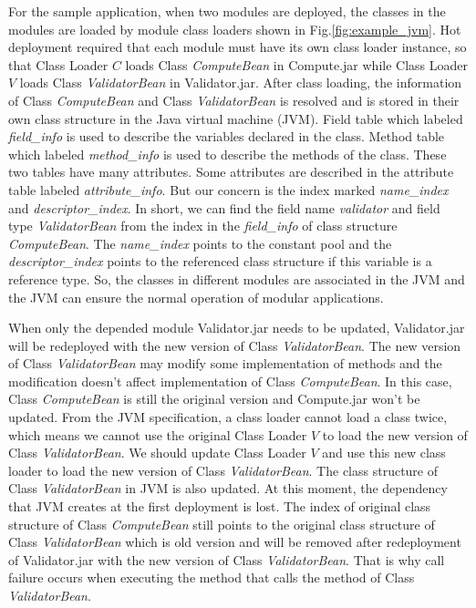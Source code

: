 \documentclass[conference]{IEEEtran}
\begin{document}
For the sample application, when two modules are deployed, the classes in the modules are loaded by module class loaders shown in Fig.\ref{fig:example_jvm}. 
Hot deployment required that each module must have its own class loader instance, so that Class Loader $C$ loads Class \emph{ComputeBean} in Compute.jar while Class Loader $V$ loads Class \emph{ValidatorBean} in Validator.jar.
After class loading, the information of Class \emph{ComputeBean} and Class \emph{ValidatorBean} is resolved and is stored in their own class structure in the Java virtual machine (JVM). 
Field table which labeled \emph{field\_info} is used to describe the variables declared in the class. 
Method table which labeled \emph{method\_info} is used to describe the methods of the class. 
These two tables have many attributes. 
Some attributes are described in the attribute table labeled \emph{attribute\_info}. 
But our concern is the index marked \emph{name\_index} and \emph{descriptor\_index}. 
In short, we can find the field name \emph{validator} and field type \emph{ValidatorBean} from the index in the \emph{field\_info} of class structure \emph{ComputeBean}. 
The \emph{name\_index} points to the constant pool and the \emph{descriptor\_index} points to the referenced class structure if this variable is a reference type\cite{jvm_book}. 
So, the classes in different modules are associated in the JVM and the JVM can ensure the normal operation of modular applications.

When only the depended module Validator.jar needs to be updated, Validator.jar will be redeployed with the new version of Class \emph{ValidatorBean}. 
The new version of Class \emph{ValidatorBean} may modify some implementation of methods and the modification doesn’t affect implementation of Class \emph{ComputeBean}. 
In this case, Class \emph{ComputeBean} is still the original version and Compute.jar won’t be updated. 
From the JVM specification\cite{jvm_specification}, a class loader cannot load a class twice, which means we cannot use the original Class Loader $V$ to load the new version of Class \emph{ValidatorBean}. 
We should update Class Loader $V$ and use this new class loader to load the new version of Class \emph{ValidatorBean}. 
The class structure of Class \emph{ValidatorBean} in JVM is also updated. 
At this moment, the dependency that JVM creates at the first deployment is lost. 
The index of original class structure of Class \emph{ComputeBean} still points to the original class structure of Class \emph{ValidatorBean} which is old version and will be removed after redeployment of Validator.jar with the new version of Class \emph{ValidatorBean}. 
That is why call failure occurs when executing the method that calls the method of Class \emph{ValidatorBean}.
\end{document}

